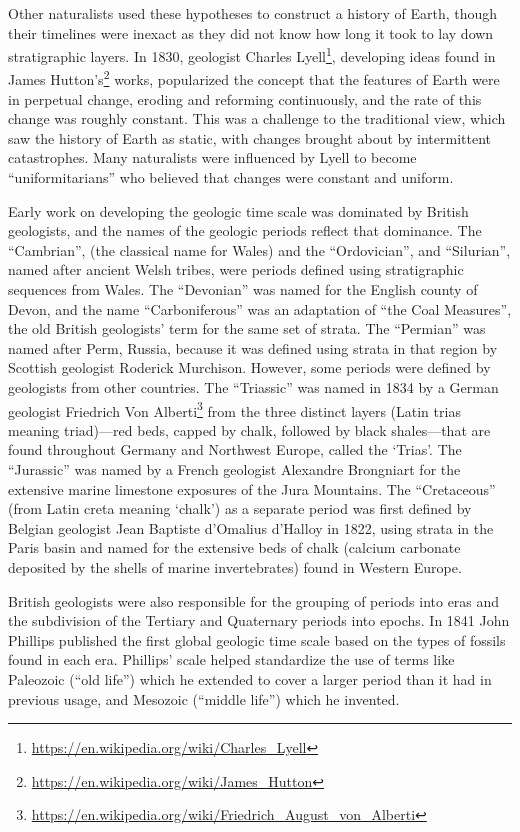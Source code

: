 \documentclass[]{book}
\let\rmarkdownfootnote\footnote%
\def\footnote{\protect\rmarkdownfootnote}
\renewcommand{\href}[2]{#2\footnote{\url{#1}}}
\theoremstyle{definition}
\theoremstyle{definition}
\theoremstyle{definition}
\theoremstyle{remark}
\begin{document}
Other naturalists used these hypotheses to construct a history of Earth,
though their timelines were inexact as they did not know how long it
took to lay down stratigraphic layers. In 1830, geologist \href{https://en.wikipedia.org/wiki/Charles_Lyell}{Charles Lyell},
developing ideas found in \href{https://en.wikipedia.org/wiki/James_Hutton}{James Hutton's} works, popularized the concept
that the features of Earth were in perpetual change, eroding and
reforming continuously, and the rate of this change was roughly
constant. This was a challenge to the traditional view, which saw the
history of Earth as static, with changes brought about by intermittent
catastrophes. Many naturalists were influenced by Lyell to become
``uniformitarians'' who believed that changes were constant and uniform.

Early work on developing the geologic time scale was dominated by
British geologists, and the names of the geologic periods reflect that
dominance. The ``Cambrian'', (the classical name for Wales) and the
``Ordovician'', and ``Silurian'', named after ancient Welsh tribes, were
periods defined using stratigraphic sequences from Wales. The
``Devonian'' was named for the English county of Devon, and the name
``Carboniferous'' was an adaptation of ``the Coal Measures'', the old
British geologists' term for the same set of strata. The ``Permian'' was
named after Perm, Russia, because it was defined using strata in that
region by Scottish geologist Roderick Murchison. However, some periods
were defined by geologists from other countries. The ``Triassic'' was
named in 1834 by a German geologist \href{https://en.wikipedia.org/wiki/Friedrich_August_von_Alberti}{Friedrich Von Alberti} from the three
distinct layers (Latin trias meaning triad)---red beds, capped by chalk,
followed by black shales---that are found throughout Germany and
Northwest Europe, called the `Trias'. The ``Jurassic'' was named by a
French geologist Alexandre Brongniart for the extensive marine limestone
exposures of the Jura Mountains. The ``Cretaceous'' (from Latin creta
meaning `chalk') as a separate period was first defined by Belgian
geologist Jean Baptiste d'Omalius d'Halloy in 1822, using strata in the Paris
basin and named for the extensive beds of chalk (calcium carbonate
deposited by the shells of marine invertebrates) found in Western
Europe.

British geologists were also responsible for the grouping of periods
into eras and the subdivision of the Tertiary and Quaternary periods
into epochs. In 1841 John Phillips published the first global geologic
time scale based on the types of fossils found in each era. Phillips'
scale helped standardize the use of terms like Paleozoic (``old life'')
which he extended to cover a larger period than it had in previous
usage, and Mesozoic (``middle life'') which he invented.
\end{document}
